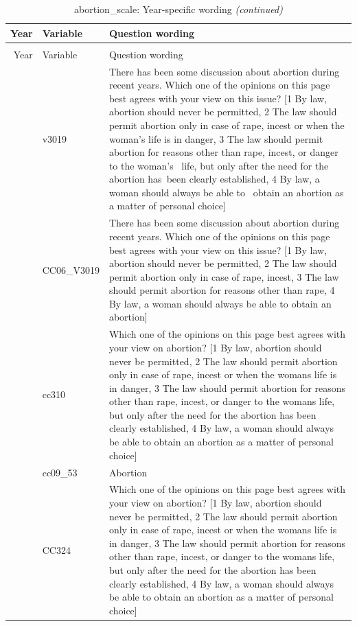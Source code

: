 \documentclass[
  12pt]{article}
\begin{document}
\begin{longtable}[t]{rl>{\raggedright\arraybackslash}p{10cm}}
\caption{\label{tab:unnamed-chunk-5}abortion\_scale: Year-specific wording}\\
\toprule
Year & Variable & Question wording\\
\midrule
\endfirsthead
\caption[]{abortion\_scale: Year-specific wording \textit{(continued)}}\\
\toprule
Year & Variable & Question wording\\
\midrule
\endhead

\endfoot
\bottomrule
\endlastfoot
2006 & v3019 & There has been some discussion about abortion during recent years.  Which one of the opinions on this page best agrees with your view on this issue? [1 By law, abortion should never be permitted, 2 The law should permit abortion only in case of rape, incest or when the woman's life is in danger, 3 The law should permit abortion for reasons other than rape, incest, or danger to the woman's  life, but only after the need for the abortion has been clearly established, 4 By law, a woman should always be able to  obtain an abortion as a matter of personal choice]\\
\addlinespace
2007 & CC06\_V3019 & There has been some discussion about abortion during recent years. Which one of the opinions on this page best agrees with your view on this issue? [1 By law, abortion should never be permitted, 2 The law should permit abortion only in case of rape, incest, 3 The law should permit abortion for reasons other than rape, 4 By law, a woman should always be able to obtain an abortion]\\
\addlinespace
2008 & cc310 & Which one of the opinions on this page best agrees with your view on abortion? [1 By law, abortion should never be permitted, 2 The law should permit abortion only in case of rape, incest or when the womans life is in danger, 3 The law should permit abortion for reasons other than rape, incest, or danger to the womans life, but only after the need for the abortion has been clearly established, 4 By law, a woman should always be able to obtain an abortion as a matter of personal choice]\\
\addlinespace
2009 & cc09\_53 & Abortion\\
\addlinespace
2010 & CC324 & Which one of the opinions on this page best agrees with your view on abortion? [1 By law, abortion should never be permitted, 2 The law should permit abortion only in case of rape, incest or when the womans life is in danger, 3 The law should permit abortion for reasons other than rape, incest, or danger to the womans life, but only after the need for the abortion has been clearly established, 4 By law, a woman should always be able to obtain an abortion as a matter of personal choice]\\

\end{longtable}
\end{document}
